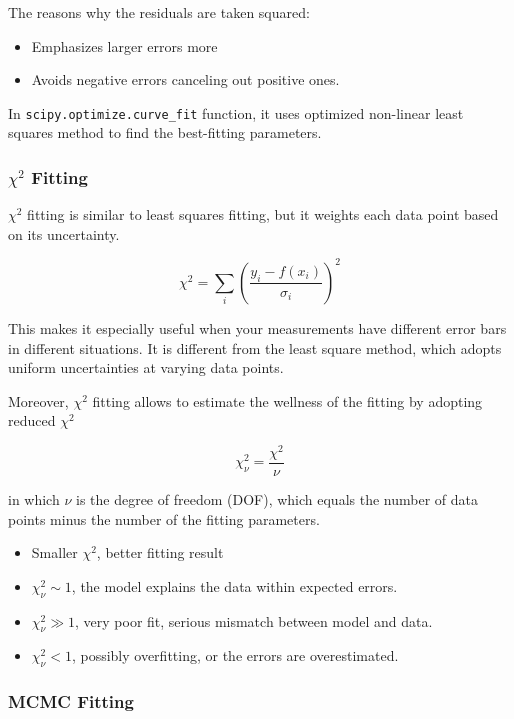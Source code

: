\documentclass[12pt,a4paper]{article}
\begin{document}
\begin{CJK}{UTF8}{bkai}
The reasons why the residuals are taken squared:
\begin{itemize}
    \item Emphasizes larger errors more
    \item Avoids negative errors canceling out positive ones.
\end{itemize}

In \texttt{scipy.optimize.curve\_fit} function, it uses optimized non-linear least squares method to find the best-fitting parameters.


\subsubsection{$\chi^2$ Fitting}
\hfill

$\chi^2$ fitting is similar to least squares fitting, but it weights each data point based on its uncertainty. 

\begin{equation}
    \chi^2=\sum_{i}\left(\frac{y_i-f(x_i)}{\sigma_i}\right)^2
\end{equation}

This makes it especially useful when your measurements have different error bars in different situations. It is different from the least square method, which adopts uniform uncertainties at varying data points.

Moreover, $\chi^2$ fitting allows to estimate the wellness of the fitting by adopting reduced $\chi^2$

\begin{equation}
    \chi_\nu^{2} = \frac{\chi^2}{\nu}
\end{equation}

in which $\nu$ is the degree of freedom (DOF), which equals the number of data points minus the number of the fitting parameters.
\begin{itemize}
    \item Smaller $\chi^2$, better fitting result
    \item $\chi_{\nu}^2\sim1$, the model explains the data within expected errors.
    \item $\chi_{\nu}^2\gg 1$, very poor fit, serious mismatch between model and data.
    \item $\chi_{\nu}^2< 1$, possibly overfitting, or the errors are overestimated.
\end{itemize}


\subsubsection{MCMC Fitting}


\end{CJK}
\end{document}
